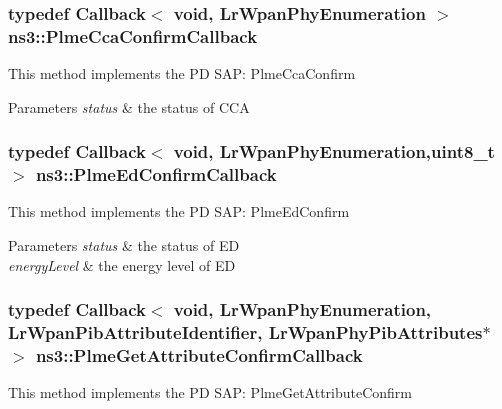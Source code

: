 \subsubsection[{\texorpdfstring{Plme\+Cca\+Confirm\+Callback}{PlmeCcaConfirmCallback}}]{\setlength{\rightskip}{0pt plus 5cm}typedef Callback$<$ void, Lr\+Wpan\+Phy\+Enumeration $>$ {\bf ns3\+::\+Plme\+Cca\+Confirm\+Callback}}\hypertarget{group__lr-wpan_gafd859f54b5982ab4c85838a40b1c7340}{}\label{group__lr-wpan_gafd859f54b5982ab4c85838a40b1c7340}
This method implements the PD S\+AP\+: Plme\+Cca\+Confirm


\begin{DoxyParams}{Parameters}
{\em status} & the status of C\+CA \\
\hline
\end{DoxyParams}
\subsubsection[{\texorpdfstring{Plme\+Ed\+Confirm\+Callback}{PlmeEdConfirmCallback}}]{\setlength{\rightskip}{0pt plus 5cm}typedef Callback$<$ void, Lr\+Wpan\+Phy\+Enumeration,uint8\+\_\+t $>$ {\bf ns3\+::\+Plme\+Ed\+Confirm\+Callback}}\hypertarget{group__lr-wpan_gadecf12d559c4db545036668cf9a384b6}{}\label{group__lr-wpan_gadecf12d559c4db545036668cf9a384b6}
This method implements the PD S\+AP\+: Plme\+Ed\+Confirm


\begin{DoxyParams}{Parameters}
{\em status} & the status of ED \\
\hline
{\em energy\+Level} & the energy level of ED \\
\hline
\end{DoxyParams}
\subsubsection[{\texorpdfstring{Plme\+Get\+Attribute\+Confirm\+Callback}{PlmeGetAttributeConfirmCallback}}]{\setlength{\rightskip}{0pt plus 5cm}typedef Callback$<$ void, Lr\+Wpan\+Phy\+Enumeration, Lr\+Wpan\+Pib\+Attribute\+Identifier, Lr\+Wpan\+Phy\+Pib\+Attributes$\ast$ $>$ {\bf ns3\+::\+Plme\+Get\+Attribute\+Confirm\+Callback}}\hypertarget{group__lr-wpan_ga024ef2b58b799155fc114f3d895ca283}{}\label{group__lr-wpan_ga024ef2b58b799155fc114f3d895ca283}
This method implements the PD S\+AP\+: Plme\+Get\+Attribute\+Confirm



